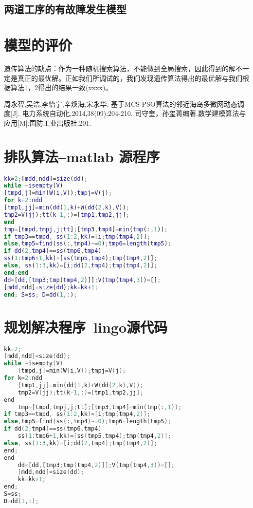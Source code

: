 \documentclass[withoutpreface,bwprint]{cumcmthesis} %
\begin{document}
\subsection{两道工序的有故障发生模型}








 
\section{模型的评价}
遗传算法的缺点：作为一种随机搜索算法，不能做到全局搜索，因此得到的解不一定是真正的最优解。正如我们所调试的，我们发现遗传算法得出的最优解与我们根据算法1，2得出的结果一致(xxxx)。



\begin{thebibliography}{9}%
  周永智,吴浩,李怡宁,辛焕海,宋永华. 基于MCS-PSO算法的邻近海岛多微网动态调度[J]. 电力系统自动化,2014,38(09):204-210.
  司守奎，孙玺菁编著.数学建模算法与应用[M].国防工业出版社,201.
\end{thebibliography}

\newpage
\begin{appendices}
\section{排队算法--matlab 源程序}
\begin{lstlisting}[language=matlab]
kk=2;[mdd,ndd]=size(dd);
while ~isempty(V)
[tmpd,j]=min(W(i,V));tmpj=V(j);
for k=2:ndd
[tmp1,jj]=min(dd(1,k)+W(dd(2,k),V));
tmp2=V(jj);tt(k-1,:)=[tmp1,tmp2,jj];
end
tmp=[tmpd,tmpj,j;tt];[tmp3,tmp4]=min(tmp(:,1));
if tmp3==tmpd, ss(1:2,kk)=[i;tmp(tmp4,2)];
else,tmp5=find(ss(:,tmp4)~=0);tmp6=length(tmp5);
if dd(2,tmp4)==ss(tmp6,tmp4)
ss(1:tmp6+1,kk)=[ss(tmp5,tmp4);tmp(tmp4,2)];
else, ss(1:3,kk)=[i;dd(2,tmp4);tmp(tmp4,2)];
end;end
dd=[dd,[tmp3;tmp(tmp4,2)]];V(tmp(tmp4,3))=[];
[mdd,ndd]=size(dd);kk=kk+1;
end; S=ss; D=dd(1,:);
 \end{lstlisting}
 \section{规划解决程序--lingo源代码}
\begin{lstlisting}[language=c]
kk=2;
[mdd,ndd]=size(dd);
while ~isempty(V)
    [tmpd,j]=min(W(i,V));tmpj=V(j);
for k=2:ndd
    [tmp1,jj]=min(dd(1,k)+W(dd(2,k),V));
    tmp2=V(jj);tt(k-1,:)=[tmp1,tmp2,jj];
end
    tmp=[tmpd,tmpj,j;tt];[tmp3,tmp4]=min(tmp(:,1));
if tmp3==tmpd, ss(1:2,kk)=[i;tmp(tmp4,2)];
else,tmp5=find(ss(:,tmp4)~=0);tmp6=length(tmp5);
if dd(2,tmp4)==ss(tmp6,tmp4)
    ss(1:tmp6+1,kk)=[ss(tmp5,tmp4);tmp(tmp4,2)];
else, ss(1:3,kk)=[i;dd(2,tmp4);tmp(tmp4,2)];
end;
end
    dd=[dd,[tmp3;tmp(tmp4,2)]];V(tmp(tmp4,3))=[];
    [mdd,ndd]=size(dd);
    kk=kk+1;
end;
S=ss;
D=dd(1,:);
 \end{lstlisting}
\end{appendices}
\end{document}
